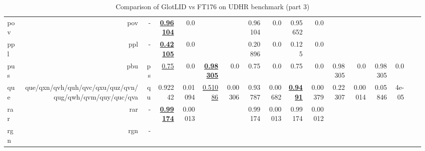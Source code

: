 \documentclass[11pt]{article}
\def\udhr{UDHR\xspace}
\def\ft176{FT176\xspace}
\begin{document}
\begin{table*}[h]
{\begin{tabular}{lrrrrrrrrrrrrrrrr}
pov         & pov         & -         & \textbf{\underline{0.96104}}         & 0.0         &          &          & 0.96104         & 0.0         & 0.95652         & 0.0         &          &          &          &          \\
ppl         & ppl         & -         & \textbf{\underline{0.42105}}         & 0.0         &          &          & 0.20896         & 0.0         & 0.125         & 0.0         &          &          &          &          \\
pus         & pbu         & ps         & \underline{0.75}         & 0.0         & \textbf{\underline{0.98305}}         & 0.0         & 0.75         & 0.0         & 0.75         & 0.0         & 0.98305         & 0.0         & 0.98305         & 0.0         \\
que         & que/qxn/qvh/quh/qvc/qxu/quz/qvn/qug/qwh/qvm/quy/quc/qva         & qu         & 0.92242         & 0.01094         & \underline{0.51086}         & 0.00306         & 0.93787         & 0.00682         & \textbf{\underline{0.9491}}         & 0.00379         & 0.22307         & 0.00014         & 0.05846         & 4e-05         \\
rar         & rar         & -         & \textbf{\underline{0.99174}}         & 0.00013         &          &          & 0.99174         & 0.00013         & 0.99174         & 0.00012         &          &          &          &          \\
rgn         & rgn         & -         &          &          &          &          &          &          &          &          &          &          &          &          \\
\end{tabular}
}
\caption{Comparison of GlotLID vs \ft176 on \udhr benchmark (part 3)}
\label{tab:appendix_glotlid_ft176_udhr_3}
\end{table*}
\end{document}
